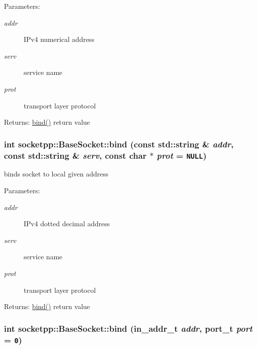 \begin{Desc}
\item[Parameters:]
\begin{description}
\item[{\em addr}]IPv4 numerical address \item[{\em serv}]service name \item[{\em prot}]transport layer protocol \end{description}
\end{Desc}
\begin{Desc}
\item[Returns:]\hyperlink{classsocketpp_1_1BaseSocket_78c2a8e6a5c7dfbc708c9cd637e88e51}{bind()} return value \end{Desc}
\hypertarget{classsocketpp_1_1BaseSocket_4775f13f8e1cceaaed40106162b2149f}{
\subsubsection[{bind}]{\setlength{\rightskip}{0pt plus 5cm}int socketpp::BaseSocket::bind (const std::string \& {\em addr}, \/  const std::string \& {\em serv}, \/  const char $\ast$ {\em prot} = {\tt NULL})}}
\label{classsocketpp_1_1BaseSocket_4775f13f8e1cceaaed40106162b2149f}


binds socket to local given address 

\begin{Desc}
\item[Parameters:]
\begin{description}
\item[{\em addr}]IPv4 dotted decimal address \item[{\em serv}]service name \item[{\em prot}]transport layer protocol \end{description}
\end{Desc}
\begin{Desc}
\item[Returns:]\hyperlink{classsocketpp_1_1BaseSocket_78c2a8e6a5c7dfbc708c9cd637e88e51}{bind()} return value \end{Desc}
\hypertarget{classsocketpp_1_1BaseSocket_d3df73f534900d40f9dff26171ec93b5}{
\subsubsection[{bind}]{\setlength{\rightskip}{0pt plus 5cm}int socketpp::BaseSocket::bind (in\_\-addr\_\-t {\em addr}, \/  {\bf port\_\-t} {\em port} = {\tt 0})}}
\label{classsocketpp_1_1BaseSocket_d3df73f534900d40f9dff26171ec93b5}


